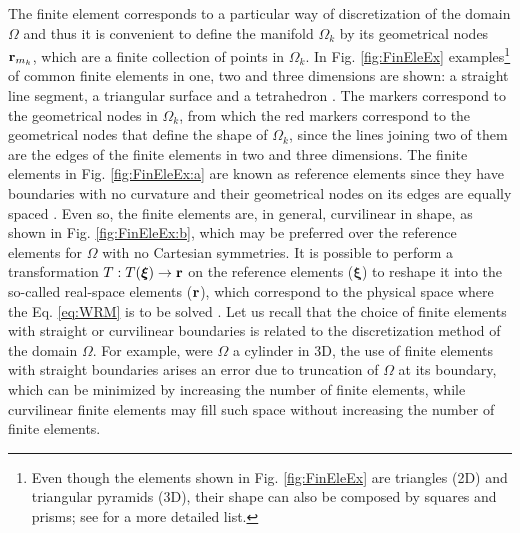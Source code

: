 %
%
%
The finite element corresponds to a particular way of discretization of the domain $\Omega$ and thus it is convenient to define the manifold $\Omega_k$ by its geometrical nodes $\vb{r}_{m_k}$, which are a finite collection of  points in $\Omega_k$. In Fig. \ref{fig:FinEleEx} examples\footnote{Even though the elements shown in Fig. \ref{fig:FinEleEx} are triangles (2D) and  triangular pyramids (3D), their shape can also be composed by squares and prisms; see \cite{dhatt_finite_2012} for a more detailed list.} of common finite elements in one, two and three dimensions are shown: a straight line segment, a triangular surface and a tetrahedron \cite{dhatt_finite_2012}. The markers correspond to the geometrical nodes in $\Omega_k$, from which the red markers correspond to the geometrical nodes that define the shape of $\Omega_k$, since the lines joining two of them are the edges of the finite elements in two and three dimensions. The finite elements in Fig. \ref{fig:FinEleEx:a} are known as reference elements since they have boundaries with no curvature and their geometrical nodes on its edges are equally spaced \cite{dhatt_finite_2012,larson_finite_2013}.   Even so, the finite elements are, in general, curvilinear in shape, as shown in Fig. \ref{fig:FinEleEx:b},  which may be preferred over the reference elements for $\Omega$ with no Cartesian symmetries. It is possible to perform a transformation $T:T(\boldsymbol{\xi})\to\vb{r}$ on the reference elements ($\boldsymbol{\xi}$) to reshape it into the so-called real-space elements ($\vb{r}$), which correspond to the physical space where the Eq. \eqref{eq:WRM} is to be solved \cite{dhatt_finite_2012,fletcher_computational_1984}.  Let us recall that the choice of finite elements with straight or curvilinear boundaries is related to the discretization method of the domain $\Omega$. For example, were $\Omega$ a cylinder in 3D, the use of finite elements with straight boundaries arises an error due to truncation of $\Omega$ at its boundary, which can be minimized by increasing the number of finite elements, while curvilinear finite elements may fill such space without increasing the number of finite elements.

